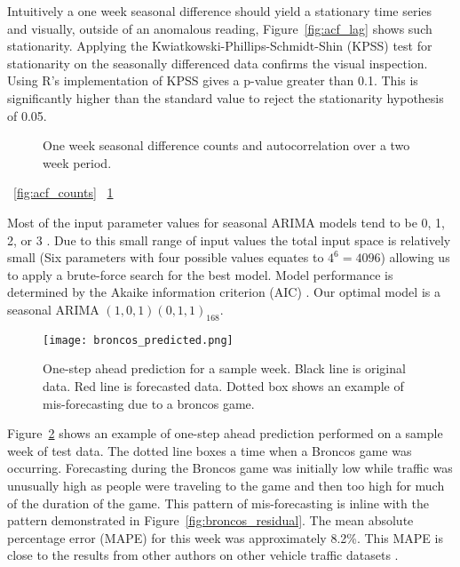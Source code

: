 Intuitively a one week seasonal difference should yield a stationary time series and visually, outside of an anomalous reading, Figure~\ref{fig:acf_lag} shows such stationarity.  Applying the Kwiatkowski-Phillips-Schmidt-Shin (KPSS) \cite{Kwiatkowski1992} test for stationarity on the seasonally differenced data confirms the visual inspection.  Using R's implementation of KPSS gives a p-value greater than 0.1.  This is significantly higher than the standard value to reject the stationarity hypothesis of 0.05.  

\begin{figure}[t]
\begin{center}
\end{center}
\caption{One week seasonal difference counts and autocorrelation over a two week period.}
\label{fig:lag_data}
\end{figure}

~\ref{fig:acf_counts}
~\ref{fig:lag_data}

Most of the input parameter values for seasonal ARIMA models tend to be 0, 1, 2, or 3 \cite{Box2008}.  Due to this small range of input values the total input space is relatively small (Six parameters with four possible values equates to $4^6 = 4096$) allowing us to apply a brute-force search for the best model.  Model performance is determined by the Akaike information criterion (AIC) \cite{Akaike1974}.  Our optimal model is a seasonal ARIMA $(1,0,1)(0,1,1)_{168}$.  

\begin{figure}[h]
\begin{center}
\texttt{[image: broncos\_predicted.png]}
\end{center}
\caption{One-step ahead prediction for a sample week.  Black line is original data.  Red line is forecasted data.  Dotted box shows an example of mis-forecasting due to a broncos game.}
\label{fig:arima_prediction}
\end{figure}

Figure~\ref{fig:arima_prediction} shows an example of one-step ahead prediction performed on a sample week of test data.  The dotted line boxes a time when a Broncos game was occurring.  Forecasting during the Broncos game was initially low while traffic was unusually high as people were traveling to the game and then too high for much of the duration of the game.  This pattern of mis-forecasting is inline with the pattern demonstrated in Figure~\ref{fig:broncos_residual}.  The mean absolute percentage error (MAPE) for this week was approximately 8.2\%.  This MAPE is close to the results from other authors on other vehicle traffic datasets \cite{Williams2003,Smith1997}.  



